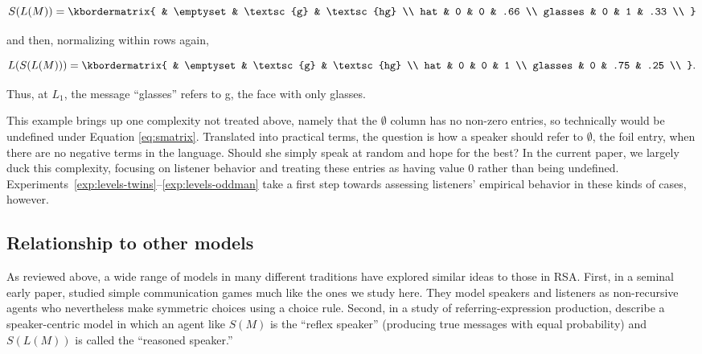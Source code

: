\documentclass[man]{apa6}
\newcounter{Experiment}
\newcommand{\exptrefrange}[2]{Experiments~\ref{#1}--\ref{#2}}
\begin{document}
\begin{equation}
    S(L(M)) = \kbordermatrix{
      & \emptyset & \textsc{g} & \textsc{hg} \\
      hat & 0 & 0 & .66  \\
      glasses & 0 & 1 & .33 \\
    }
\end{equation}

\noindent and then, normalizing within rows again,

\begin{equation}
L(S(L(M))) = \kbordermatrix{
  & \emptyset & \textsc{g} & \textsc{hg} \\
  hat & 0 & 0 & 1 \\
  glasses & 0 & .75 & .25 \\
}.
\end{equation}

\noindent Thus, at $L_1$, the message ``glasses'' refers to {\sc g}, the face with only glasses.

This example brings up one complexity not treated above, namely that the $\emptyset$ column has no non-zero entries, so technically would be undefined under Equation \ref{eq:smatrix}. Translated into practical terms, the question is how a speaker should refer to $\emptyset$, the foil entry, when there are no negative terms in the language. Should she simply speak at random and hope for the best? In the current paper, we largely duck this complexity, focusing on listener behavior and treating these entries as having value 0 rather than being undefined. \exptrefrange{exp:levels-twins}{exp:levels-oddman} take a first step towards assessing listeners' empirical behavior in these kinds of cases, however.

\subsection{Relationship to other models}

As reviewed above, a wide range of models in many different traditions have explored similar ideas to those in RSA.
First, in a seminal early paper,  studied simple communication games much like the ones we study here. They model speakers and listeners as non-recursive agents who nevertheless make symmetric choices using a  choice rule. Second, in a study of referring-expression production,  describe a speaker-centric model in which an agent like $S(M)$ is the ``reflex speaker'' (producing true messages with equal probability) and $S(L(M))$ is called the ``reasoned speaker.''
\end{document}
